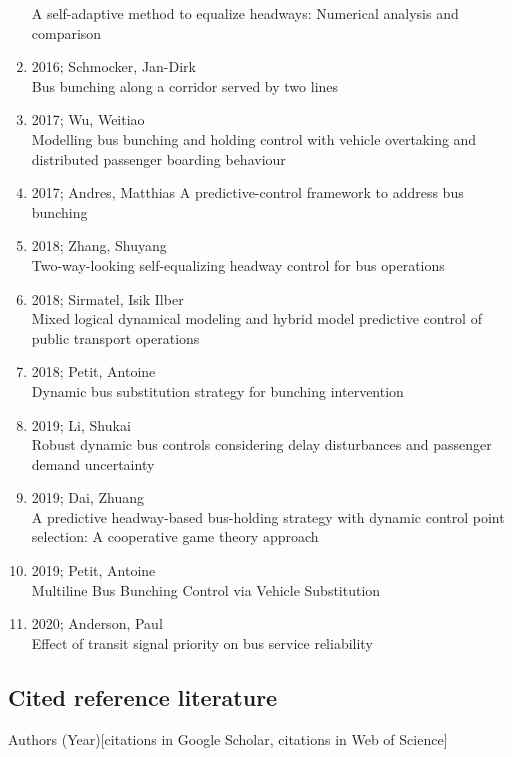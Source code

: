 \documentclass{article}
\begin{document}
\begin{enumerate}
    A self-adaptive method to equalize headways: Numerical analysis and comparison                                           
    \item 2016; Schmocker, Jan-Dirk\\
    Bus bunching along a corridor served by two lines                                                                        
    \item 2017; Wu, Weitiao\\
    Modelling bus bunching and holding control with vehicle overtaking and distributed passenger boarding behaviour          
    \item 2017; Andres, Matthias
    A predictive-control framework to address bus bunching                                                                   
    \item 2018; Zhang, Shuyang\\
    Two-way-looking self-equalizing headway control for bus operations                                                       
    \item 2018; Sirmatel, Isik Ilber\\
    Mixed logical dynamical modeling and hybrid model predictive control of public transport operations                      
    \item 2018; Petit, Antoine\\
    Dynamic bus substitution strategy for bunching intervention                                                              
    \item 2019; Li, Shukai\\
    Robust dynamic bus controls considering delay disturbances and passenger demand uncertainty                              
    \item 2019; Dai, Zhuang\\
    A predictive headway-based bus-holding strategy with dynamic control point selection: A cooperative game theory approach 
    \item 2019; Petit, Antoine\\
    Multiline Bus Bunching Control via Vehicle Substitution                                                                  
    \item 2020; Anderson, Paul\\
    Effect of transit signal priority on bus service reliability    
\end{enumerate}

\subsection*{Cited reference literature}
\noindent Authors (Year)[citations in Google Scholar, citations in Web of Science]\\
\end{document}
